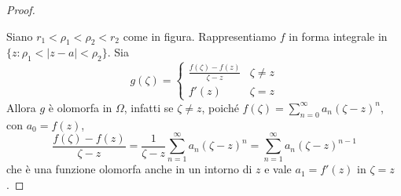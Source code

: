 \begin{proof}
\begin{figure}[ht]
    \centering
\end{figure}
    Siano \(r_{1} < \rho_{1} < \rho_{2} < r_{2}\) come in figura. Rappresentiamo \(f\) in forma
    integrale in \(\{z : \rho_{1} < |z-a| < \rho_{2}\} \). Sia 
    \[
        g{(\zeta)} = \begin{cases}
            \frac{f{(\zeta)} - f{(z)}}{\zeta - z} & \zeta \neq z \\
            f'{(z)} & \zeta = z
        \end{cases}
    \]
    Allora \(g\) è olomorfa in \(\Omega\), infatti se \(\zeta \neq z\), poiché
    \(\displaystyle f{(\zeta)} = \sum_{n=0}^{\infty} a_{n} {(\zeta - z)}^{n} \),
    con \(a_{0} = f{(z)}\),
    \[
        \frac{f{(\zeta)} - f{(z)}}{\zeta -z} = \frac{1}{\zeta-
        z}\sum_{n=1}^{\infty} a_{n} {(\zeta -z)}^{n} = \sum_{n=1}^{\infty}
        a_{n}{(\zeta - z)}^{n-1} 
    \]
    che è una funzione olomorfa anche in un intorno di \(z\) e vale
    \(a_{1} = f'{(z)}\) in \(\zeta = z\).


\end{proof}
